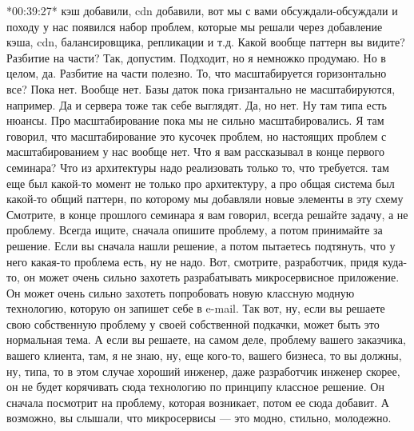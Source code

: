 \documentclass[12pt]{article} %
\begin{document}
*00:39:27*
кэш добавили, cdn добавили, вот мы с вами обсуждали-обсуждали и походу у нас появился набор проблем, которые мы решали через добавление кэша, cdn, балансировщика, репликации и т.д.  Какой вообще паттерн вы видите?  Разбитие на части?  Так, допустим.  Подходит, но я немножко продумаю.  Но в целом, да. Разбитие на части полезно.  То, что масштабируется горизонтально все?  Пока нет. Вообще нет.  Базы даток пока гризантально не масштабируются, например.  Да и сервера тоже так себе выглядят.  Да, но нет. Ну там типа есть нюансы.  Про масштабирование пока мы не сильно масштабировались.  Я там говорил, что масштабирование это кусочек проблем, но настоящих проблем с масштабированием у нас вообще нет.  Что я вам рассказывал в конце первого семинара?  Что из архитектуры надо реализовать только то, что требуется.  там еще был какой-то момент не только про архитектуру, а про общая система был какой-то общий паттерн, по которому мы добавляли новые элементы в эту схему Смотрите, в конце прошлого семинара я вам говорил, всегда решайте задачу, а не проблему.  Всегда ищите, сначала опишите проблему, а потом принимайте за решение.  Если вы сначала нашли решение, а потом пытаетесь подтянуть, что у него какая-то проблема есть, ну не надо.  Вот, смотрите, разработчик, придя куда-то, он может очень сильно захотеть разрабатывать микросервисное приложение.  Он может очень сильно захотеть попробовать новую классную модную технологию, которую он запишет себе в e-mail.  Так вот, ну, если вы решаете свою собственную проблему у своей собственной подкачки, может быть это нормальная тема.  А если вы решаете, на самом деле, проблему вашего заказчика, вашего клиента, там, я не знаю, ну, еще кого-то, вашего бизнеса, то вы должны, ну, типа, то в этом случае хороший инженер, даже разработчик инженер скорее, он не будет корячивать сюда технологию по принципу классное решение.  Он сначала посмотрит на проблему, которая возникает, потом ее сюда добавит.  А возможно, вы слышали, что микросервисы — это модно, стильно, молодежно.
\end{document}
